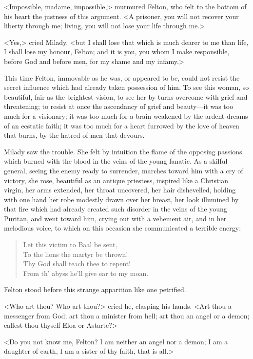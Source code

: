 <Impossible, madame, impossible,> murmured Felton, who felt to the bottom of his heart the justness of this argument. <A prisoner, you will not recover your liberty through me; living, you will not lose your life through me.> 

<Yes,> cried Milady, <but I shall lose that which is much dearer to me than life, I shall lose my honour, Felton; and it is you, you whom I make responsible, before God and before men, for my shame and my infamy.> 

This time Felton, immovable as he was, or appeared to be, could not resist the secret influence which had already taken possession of him. To see this woman, so beautiful, fair as the brightest vision, to see her by turns overcome with grief and threatening; to resist at once the ascendancy of grief and beauty—it was too much for a visionary; it was too much for a brain weakened by the ardent dreams of an ecstatic faith; it was too much for a heart furrowed by the love of heaven that burns, by the hatred of men that devours. 

Milady saw the trouble. She felt by intuition the flame of the opposing passions which burned with the blood in the veins of the young fanatic. As a skilful general, seeing the enemy ready to surrender, marches toward him with a cry of victory, she rose, beautiful as an antique priestess, inspired like a Christian virgin, her arms extended, her throat uncovered, her hair dishevelled, holding with one hand her robe modestly drawn over her breast, her look illumined by that fire which had already created such disorder in the veins of the young Puritan, and went toward him, crying out with a vehement air, and in her melodious voice, to which on this occasion she communicated a terrible energy: 
\begin{verse}
Let this victim to Baal be sent,\\
To the lions the martyr be thrown!\\
Thy God shall teach thee to repent!\\
From th' abyss he'll give ear to my moan.
\end{verse}

Felton stood before this strange apparition like one petrified. 

<Who art thou? Who art thou?> cried he, clasping his hands. <Art thou a messenger from God; art thou a minister from hell; art thou an angel or a demon; callest thou thyself Eloa or Astarte?> 

<Do you not know me, Felton? I am neither an angel nor a demon; I am a daughter of earth, I am a sister of thy faith, that is all.> 

